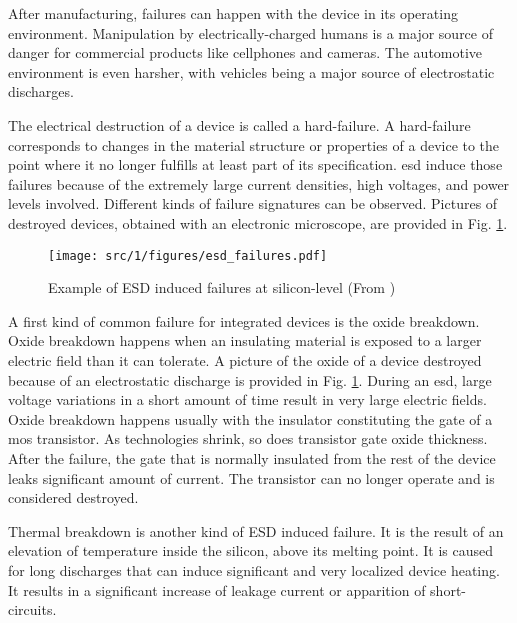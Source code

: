 After manufacturing, failures can happen with the device in its operating environment.
Manipulation by electrically-charged humans is a major source of danger for commercial products like cellphones and cameras.
The automotive environment is even harsher, with vehicles being a major source of electrostatic discharges.

The electrical destruction of a device is called a hard-failure.
A hard-failure corresponds to changes in the material structure or properties of a device to the point where it no longer fulfills at least part of its specification.
\gls{esd} induce those failures because of the extremely large current densities, high voltages, and power levels involved.
Different kinds of failure signatures can be observed.
Pictures of destroyed devices, obtained with an electronic microscope, are provided in Fig. \ref{fig:silicon-level-failures}.

\begin{figure}[!h]
  \centering
  \texttt{[image: src/1/figures/esd\_failures.pdf]}
  \caption{Example of ESD induced failures at silicon-level (From \cite{esd-robust-product})}
  \label{fig:silicon-level-failures}
\end{figure}


A first kind of common failure for integrated devices is the oxide breakdown.
Oxide breakdown happens when an insulating material is exposed to a larger electric field than it can tolerate.
A picture of the oxide of a device destroyed because of an electrostatic discharge is provided in Fig. \ref{fig:silicon-level-failures}.
During an \gls{esd}, large voltage variations in a short amount of time result in very large electric fields.
Oxide breakdown happens usually with the insulator constituting the gate of a \gls{mos} transistor.
As technologies shrink, so does transistor gate oxide thickness.
After the failure, the gate that is normally insulated from the rest of the device leaks significant amount of current.
The transistor can no longer operate and is considered destroyed.

Thermal breakdown is another kind of ESD induced failure.
It is the result of an elevation of temperature inside the silicon, above its melting point.
It is caused for long discharges that can induce significant and very localized device heating.
It results in a significant increase of leakage current or apparition of short-circuits.

